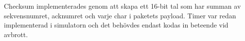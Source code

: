 Checksum implementerades genom att skapa ett 16-bit tal som har summan av sekvensnumret, acknumret och varje char i paketets payload. 
Timer var redan implementerad i simulatorn och det behövdes endast kodas in beteende vid avbrott. 
